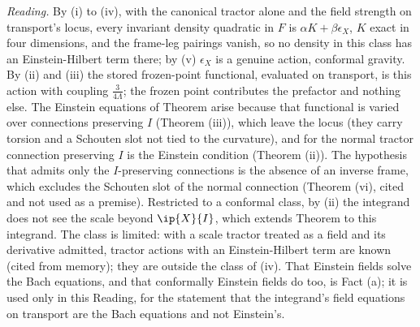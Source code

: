 \emph{Reading.} By (i) to (iv), with the canonical tractor alone and the field strength on transport's locus, every invariant density quadratic in $F$ is $\alpha K + \beta\epsilon_{X}$, $K$ exact in four dimensions, and the frame-leg pairings vanish, so no density in this class has an Einstein-Hilbert term there; by (v) $\epsilon_{X}$ is a genuine action, conformal gravity. By (ii) and (iii) the stored frozen-point functional, evaluated on transport, is this action with coupling $\tfrac{3}{4\Lambda}$; the frozen point contributes the prefactor and nothing else. The Einstein equations of Theorem  arise because that functional is varied over connections preserving $I$ (Theorem (iii)), which leave the locus (they carry torsion and a Schouten slot not tied to the curvature), and for the normal tractor connection preserving $I$ is the Einstein condition (Theorem (ii)). The hypothesis that admits only the $I$-preserving connections is the absence of an inverse frame, which excludes the Schouten slot of the normal connection (Theorem (vi), cited and not used as a premise). Restricted to a conformal class, by (ii) the integrand does not see the scale beyond $\ip{X}{I}$, which extends Theorem  to this integrand. The class is limited: with a scale tractor treated as a field and its derivative admitted, tractor actions with an Einstein-Hilbert term are known (cited from memory); they are outside the class of (iv). That Einstein fields solve the Bach equations, and that conformally Einstein fields do too, is Fact (a); it is used only in this Reading, for the statement that the integrand's field equations on transport are the Bach equations and not Einstein's.
